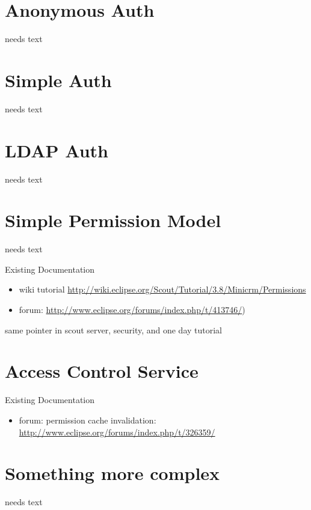 \documentclass[a4paper,10pt,twoside]{book}
\begin{document}
\section{Anonymous Auth}
needs text

\section{Simple Auth}
needs text

\section{LDAP Auth}
needs text

\section{Simple Permission Model}
needs text

\noindent Existing Documentation
\begin{itemize}
  \item wiki tutorial \url{http://wiki.eclipse.org/Scout/Tutorial/3.8/Minicrm/Permissions}
  \item forum: \url{http://www.eclipse.org/forums/index.php/t/413746/})
\end{itemize}

same pointer in scout server, security, and one day tutorial


\section{Access Control Service}

\noindent Existing Documentation
\begin{itemize}
  \item forum: permission cache invalidation: \url{http://www.eclipse.org/forums/index.php/t/326359/}
\end{itemize}

\section{Something more complex}
needs text
\end{document}
